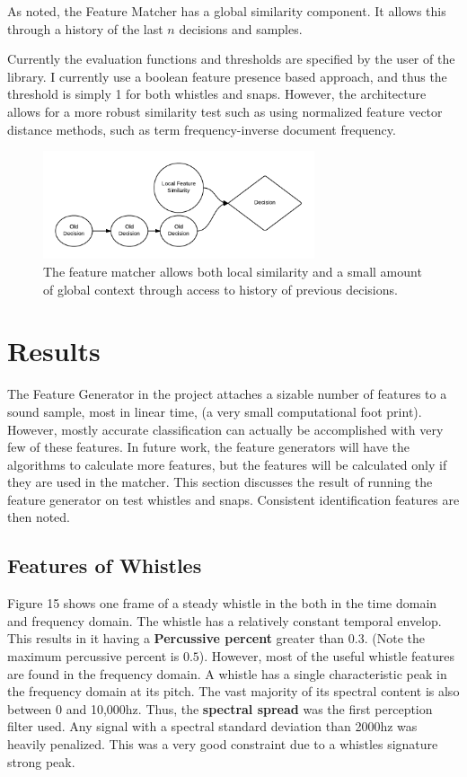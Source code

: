 \documentclass[DIV=calc, paper=a4, fontsize=11pt, twocolumn]{scrartcl}   %
\begin{document}
\par As noted, the Feature Matcher has a global similarity component. It allows this through a history of the last $n$ decisions and samples.

\par Currently the evaluation functions and thresholds are specified by the user of the library. I currently use a boolean feature presence based approach, and thus the threshold is simply 1 for both whistles and snaps. However, the architecture allows for a more robust similarity test such as using normalized feature vector distance methods, such as term frequency-inverse document frequency.

\begin{figure}[h]
   \centering
   \includegraphics[width=80mm]{figures/FeatureMatcherFuture.png}
   \caption{The feature matcher allows both local similarity and a small amount of global context through access to history of previous decisions.}
   \label{overflow}
\end{figure}

\section{Results}
   The Feature Generator in the project attaches a sizable number of features to a sound sample, most in linear time,  (a very small computational foot print). However, mostly accurate classification can actually be accomplished with very few of these features. In future work, the feature generators will have the algorithms to calculate more features, but the features will be calculated only if they are used in the matcher. This section discusses the result of running the feature generator on test whistles and snaps. Consistent identification features are then noted.
   \subsection{Features of Whistles}

   Figure 15 shows one frame of a steady whistle in the both in the time domain and frequency domain. The whistle has a relatively constant temporal envelop. This results in it having a \textbf{Percussive percent} greater than $0.3$. (Note the maximum percussive percent is $0.5$).  However, most of the useful whistle features are found in the frequency domain. A whistle has a single characteristic peak in the frequency domain at its pitch. The vast majority of its spectral content is also between 0 and 10,000hz. Thus, the \textbf{spectral spread} was the first perception filter used. Any signal with a spectral standard deviation than 2000hz was heavily penalized. This was a very good constraint due to a whistles signature strong peak.
   \par
\end{document}
